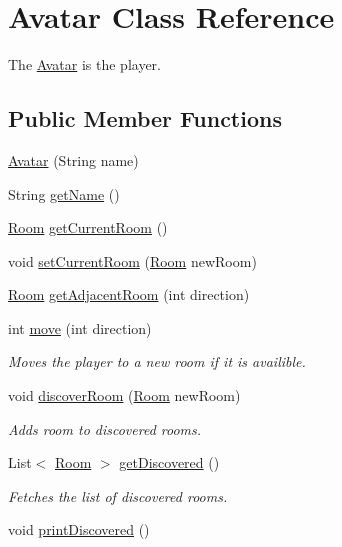 \hypertarget{classAvatar}{}\section{Avatar Class Reference}
\label{classAvatar}


The \hyperlink{classAvatar}{Avatar} is the player.  


\subsection*{Public Member Functions}
\begin{DoxyCompactItemize}
\item 
\hyperlink{classAvatar_a7d1666c152fc18894c89952056157655}{Avatar} (String name)
\item 
String \hyperlink{classAvatar_ad38c9c9193cb31f148d055c0e5f21220}{get\+Name} ()
\item 
\hyperlink{classRoom}{Room} \hyperlink{classAvatar_a2ddc7dc9d3d84486a6364c76b2f2f925}{get\+Current\+Room} ()
\item 
void \hyperlink{classAvatar_a1936a0595cb77137f114016ddaad96eb}{set\+Current\+Room} (\hyperlink{classRoom}{Room} new\+Room)
\item 
\hyperlink{classRoom}{Room} \hyperlink{classAvatar_a8ce1a94916888a549fc8315e0ba19af9}{get\+Adjacent\+Room} (int direction)
\item 
int \hyperlink{classAvatar_a126da75edbc8befd641c854559d2f37b}{move} (int direction)
\begin{DoxyCompactList}\small\item\em Moves the player to a new room if it is availible. \end{DoxyCompactList}\item 
void \hyperlink{classAvatar_ab5d927b79ce7bd457a49380d8aa8c9cf}{discover\+Room} (\hyperlink{classRoom}{Room} new\+Room)
\begin{DoxyCompactList}\small\item\em Adds room to discovered rooms. \end{DoxyCompactList}\item 
\hypertarget{classAvatar_a955bc3a1e7885c2087a2a5f862788389}{}List$<$ \hyperlink{classRoom}{Room} $>$ \hyperlink{classAvatar_a955bc3a1e7885c2087a2a5f862788389}{get\+Discovered} ()\label{classAvatar_a955bc3a1e7885c2087a2a5f862788389}

\begin{DoxyCompactList}\small\item\em Fetches the list of discovered rooms. \end{DoxyCompactList}\item 
\hypertarget{classAvatar_acc903602ae6bf55bec0fab185e5a4320}{}void \hyperlink{classAvatar_acc903602ae6bf55bec0fab185e5a4320}{print\+Discovered} ()\label{classAvatar_acc903602ae6bf55bec0fab185e5a4320}


\end{DoxyCompactItemize}
